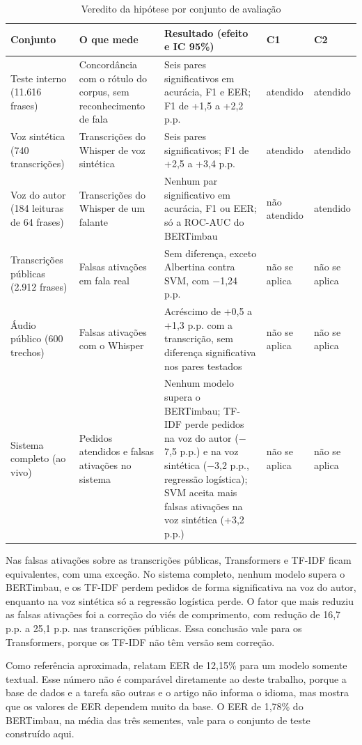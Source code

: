 \documentclass[
    12pt,                %
    openright,           %
    oneside,             %
    a4paper,             %
    english,             %
    brazil               %
]{abntex2}
\begin{document}
\begin{table}[htb]
\centering
\caption{Veredito da hipótese por conjunto de avaliação}
\label{tab:veredito}
\small
\begin{tabularx}{\textwidth}{ZZZll}
\toprule
Conjunto & O que mede & Resultado (efeito e IC 95\%) & C1 & C2 \\
\midrule
Teste interno (11.616 frases) & Concordância com o rótulo do corpus, sem reconhecimento de fala & Seis pares significativos em acurácia, F1 e EER; F1 de +1,5 a +2,2 p.p. & atendido & atendido \\
Voz sintética (740 transcrições) & Transcrições do Whisper de voz sintética & Seis pares significativos; F1 de +2,5 a +3,4 p.p. & atendido & atendido \\
Voz do autor (184 leituras de 64 frases) & Transcrições do Whisper de um falante & Nenhum par significativo em acurácia, F1 ou EER; só a ROC-AUC do BERTimbau & não atendido & atendido \\
Transcrições públicas (2.912 frases) & Falsas ativações em fala real & Sem diferença, exceto Albertina contra SVM, com $-$1,24 p.p. & não se aplica & não se aplica \\
Áudio público (600 trechos) & Falsas ativações com o Whisper & Acréscimo de +0,5 a +1,3 p.p. com a transcrição, sem diferença significativa nos pares testados & não se aplica & não se aplica \\
Sistema completo (ao vivo) & Pedidos atendidos e falsas ativações no sistema & Nenhum modelo supera o BERTimbau; TF-IDF perde pedidos na voz do autor ($-$7,5 p.p.) e na voz sintética ($-$3,2 p.p., regressão logística); SVM aceita mais falsas ativações na voz sintética (+3,2 p.p.) & não se aplica & não se aplica \\
\bottomrule
\end{tabularx}
\end{table}

Nas falsas ativações sobre as transcrições públicas, Transformers e TF-IDF ficam equivalentes, com uma exceção. No sistema completo, nenhum modelo supera o BERTimbau, e os TF-IDF perdem pedidos de forma significativa na voz do autor, enquanto na voz sintética só a regressão logística perde. O fator que mais reduziu as falsas ativações foi a correção do viés de comprimento, com redução de 16,7 p.p. a 25,1 p.p. nas transcrições públicas. Essa conclusão vale para os Transformers, porque os TF-IDF não têm versão sem correção.

Como referência aproximada,  relatam EER de 12,15\% para um modelo somente textual. Esse número não é comparável diretamente ao deste trabalho, porque a base de dados e a tarefa são outras e o artigo não informa o idioma, mas mostra que os valores de EER dependem muito da base. O EER de 1,78\% do BERTimbau, na média das três sementes, vale para o conjunto de teste construído aqui.
\end{document}
